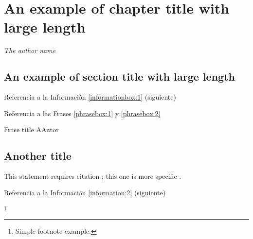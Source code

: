 \chapter{An example of chapter title with large length}

\begin{phrasebox}{}{\textit{The author name}}
\label{phrasebox:2}
\textit{\lipsum[1][1-3]}
\end{phrasebox}

\vspace{1ex}
\lipsum[1][1-3] 
\section{An example of section title with large length}

\lipsum[1][1-3] 
Referencia a la Información \ref{informationbox:1} (siguiente)

\begin{informationbox}[Título A]
\label{informationbox:1}
\lipsum[1][1-3] 
\end{informationbox}

\lipsum[1]

\lipsum[1][1-3]
Referencia a las Frases \ref{phrasebox:1} y \ref{phrasebox:2} 

\begin{phrasebox}{Frase title A}{Autor}
\label{phrasebox:1}
\lipsum[1][1-2] 
\end{phrasebox}

\lipsum[1][1-3] 

\begin{citationbox}
\lipsum[1][1-3] 
\end{citationbox}

\section{Another title}

This statement requires citation \cite{book_key}; this one is more specific \cite[122]{article_key}.
\lipsum[1][1-4]
 
Referencia a la Información \ref{information:2} (siguiente)

\begin{informationbox}[Título B]
\label{information:2}
\lipsum[1][1-3]\footnote{Simple footnote example.}
\end{informationbox}

